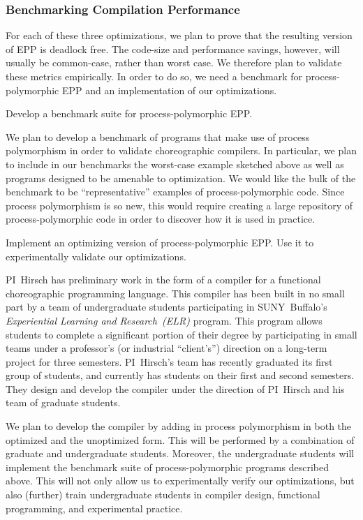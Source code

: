 \subsubsection{Benchmarking Compilation Performance}

For each of these three optimizations, we plan to prove that the resulting version of EPP is deadlock free.
The code-size and performance savings, however, will usually be common-case, rather than worst case.
We therefore plan to validate these metrics empirically.
In order to do so, we need a benchmark for process-polymorphic EPP and an implementation of our optimizations.

\begin{goal}
  Develop a benchmark suite for process-polymorphic EPP.
\end{goal}

We plan to develop a benchmark of programs that make use of process polymorphism in order to validate choreographic compilers.
In particular, we plan to include in our benchmarks the worst-case example sketched above as well as programs designed to be amenable to optimization.
We would like the bulk of the benchmark to be ``representative'' examples of process-polymorphic code.
Since process polymorphism is so new, this would require creating a large repository of process-polymorphic code in order to discover how it is used in practice.

\begin{goal}
  Implement an optimizing version of process-polymorphic EPP.
  Use it to experimentally validate our optimizations.
\end{goal}

PI~Hirsch has preliminary work in the form of a compiler for a functional choreographic programming language.
This compiler has been built in no small part by a team of undergraduate students participating in SUNY~Buffalo's \emph{Experiential Learning and Research~(ELR)} program.
This program allows students to complete a significant portion of their degree by participating in small teams under a professor's (or industrial ``client's'') direction on a long-term project for three semesters.
PI~Hirsch's team has recently graduated its first group of students, and currently has students on their first and second semesters.
They design and develop the compiler under the direction of PI~Hirsch and his team of graduate students.

We plan to develop the compiler by adding in process polymorphism in both the optimized and the unoptimized form.
This will be performed by a combination of graduate and undergraduate students.
Moreover, the undergraduate students will implement the benchmark suite of process-polymorphic programs described above.
This will not only allow us to experimentally verify our optimizations, but also (further) train undergraduate students in compiler design, functional programming, and experimental practice.

